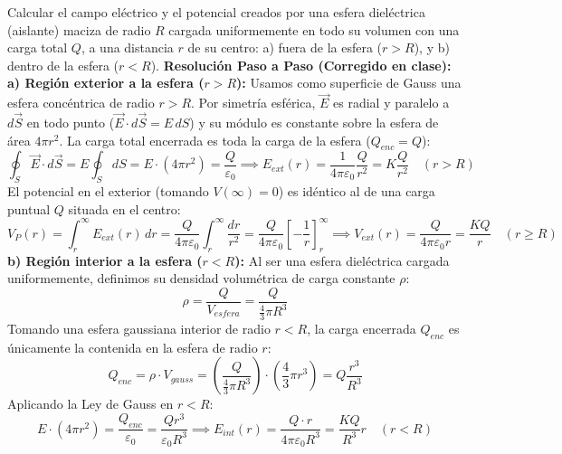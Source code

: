 \begin{ejercicio}
Calcular el campo eléctrico y el potencial creados por una esfera dieléctrica (aislante) maciza de radio $R$ cargada uniformemente en todo su volumen con una carga total $Q$, a una distancia $r$ de su centro: a) fuera de la esfera ($r > R$), y b) dentro de la esfera ($r < R$).
\tcbline
\textbf{Resolución Paso a Paso (Corregido en clase):}\\[4pt]
\textbf{a) Región exterior a la esfera ($r > R$):}
Usamos como superficie de Gauss una esfera concéntrica de radio $r > R$. Por simetría esférica, $\vec{E}$ es radial y paralelo a $d\vec{S}$ en todo punto ($\vec{E}\cdot d\vec{S} = E\,dS$) y su módulo es constante sobre la esfera de área $4\pi r^2$. La carga total encerrada es toda la carga de la esfera ($Q_{enc} = Q$):
\begin{equation}
    \oint_S \vec{E}\cdot d\vec{S} = E \oint_S dS = E \cdot (4\pi r^2) = \frac{Q}{\varepsilon_0} \implies \boxed{E_{ext}(r) = \frac{1}{4\pi\varepsilon_0} \frac{Q}{r^2} = K \frac{Q}{r^2}} \quad (r > R)
\end{equation}
El potencial en el exterior (tomando $V(\infty) = 0$) es idéntico al de una carga puntual $Q$ situada en el centro:
\begin{equation}
    V_P(r) = \int_r^\infty E_{ext}(r)\, dr = \frac{Q}{4\pi\varepsilon_0} \int_r^\infty \frac{dr}{r^2} = \frac{Q}{4\pi\varepsilon_0} \left[-\frac{1}{r}\right]_r^\infty \implies \boxed{V_{ext}(r) = \frac{Q}{4\pi\varepsilon_0 r} = \frac{K Q}{r}} \quad (r \ge R)
\end{equation}
\textbf{b) Región interior a la esfera ($r < R$):}
Al ser una esfera dieléctrica cargada uniformemente, definimos su densidad volumétrica de carga constante $\rho$:
\begin{equation}
    \rho = \frac{Q}{V_{esfera}} = \frac{Q}{\frac{4}{3}\pi R^3}
\end{equation}
Tomando una esfera gaussiana interior de radio $r < R$, la carga encerrada $Q_{enc}$ es únicamente la contenida en la esfera de radio $r$:
\begin{equation}
    Q_{enc} = \rho \cdot V_{gauss} = \left(\frac{Q}{\frac{4}{3}\pi R^3}\right) \cdot \left(\frac{4}{3}\pi r^3\right) = Q \frac{r^3}{R^3}
\end{equation}
Aplicando la Ley de Gauss en $r < R$:
\begin{equation}
    E \cdot (4\pi r^2) = \frac{Q_{enc}}{\varepsilon_0} = \frac{Q r^3}{\varepsilon_0 R^3} \implies \boxed{E_{int}(r) = \frac{Q \cdot r}{4\pi\varepsilon_0 R^3} = \frac{K Q}{R^3} r} \quad (r < R)

\end{equation}
\end{ejercicio}
